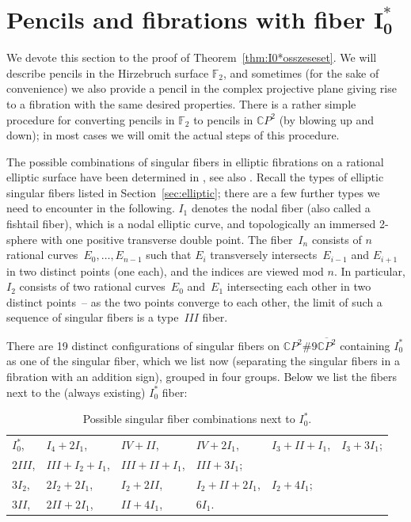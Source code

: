 \documentclass[10pt,a4paper]{amsart}
\newcommand{\CP}[1]{\mathbb{C}P^{#1}} %
\numberwithin{equation}{section}
\begin{document}
\section[Pencils and fibrations with fiber $I_0^*$]{Pencils and fibrations with fiber $\boldsymbol{I_0^*}$}\label{sec:app}

We devote this section to the proof of
Theorem~\ref{thm:I0*osszeseset}. We will describe pencils in the
Hirzebruch surface ${\mathbb {F}}_2$, and sometimes (for the sake of
convenience) we also provide a pencil in the complex projective plane
giving rise to a fibration with the same desired properties. There is a
rather simple procedure for converting pencils in ${\mathbb {F}}_2$ to
pencils in $\CP{2}$ (by blowing up and down); in most cases we will
omit the actual steps of this procedure.

The possible combinations of singular fibers in elliptic fibrations on
a rational elliptic surface have been determined in \cite{Miranda, Persson},
see also \cite{SSS}. Recall the types of elliptic singular
fibers listed in Section~\ref{sec:elliptic}; there are a few further
types we need to encounter in the following. $I_1$ denotes the nodal
fiber (also called a fishtail fiber), which is a nodal elliptic curve,
and topologically an immersed 2-sphere with one positive transverse
double point. The fiber~$I_n$ consists of $n$ rational curves~$E_0,
\ldots, E_{n-1}$ such that $E_i$ transversely intersects~$E_{i-1}$ and
$E_{i+1}$ in two distinct points (one each), and the indices are viewed mod
$n$. In particular, $I_2$ consists of two rational curves~$E_0$ and~$E_1$ intersecting each other in two distinct points~-- as the two points
converge to each other, the limit of such a sequence of singular
fibers is a type~$III$ fiber.

There are 19 distinct configurations of singular fibers
on $\CP{2}\# 9 {\overline {\CP{2}}}$ containing $I_0^*$ as one of
the singular fiber, which
we list now (separating the singular fibers in a fibration with an
addition sign), grouped in four groups. Below we list the fibers
next to the (always existing) $I_0^*$ fiber:

\begin{table}[h!]\centering
\begin{tabular}{llllll}
$I_0^*$,& $I_4+2I_1$,& $IV+II$,& $IV+2I_1$, & $I_3+II+I_1$,& $I_3+3I_1$; \\
$2III$,& $III+I_2+I_1$,& $III+II+I_1$,& $III+3I_1$; & &\\
$3I_2$,& $2I_2+2I_1$,& $I_2+2II$,& $I_2 +II +2I_1$,& $I_2+4I_1$; & \\
$3II$,& $2II+2I_1$,& $II+4I_1$,& $6I_1$. & &
\end{tabular}
\caption{Possible singular fiber combinations next to $I_0^*$.}\label{tab:singfibers}
\end{table}
\end{document}
